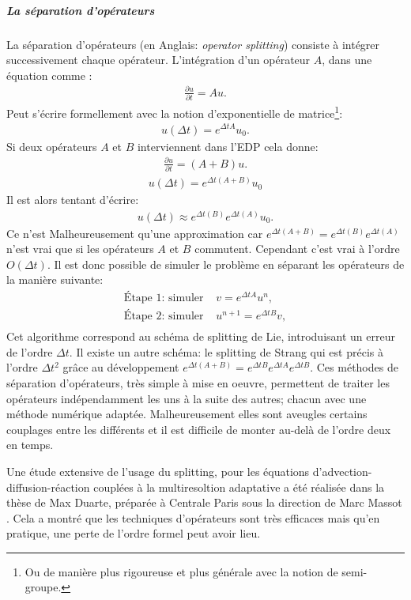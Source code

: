         \subparagraph{La séparation d'opérateurs}
            La séparation d'opérateurs (en Anglais: \textit{operator splitting}) consiste à intégrer successivement chaque opérateur.
            L'intégration d'un opérateur $A$, dans une équation comme :
            \begin{align}\frac{\partial u}{\partial t} = Au.\end{align}
            Peut s'écrire formellement avec la notion d'exponentielle de matrice\footnote{Ou de manière plus rigoureuse et plus générale avec la notion de semi-groupe.}:
            \begin{align}u(\Delta t) = e^{\Delta tA}u_0.\end{align}
            Si deux opérateurs $A$ et $B$ interviennent dans l'EDP cela donne:
            \begin{align}\frac{\partial u}{\partial t} = (A+B)u.\end{align}
            \begin{align}u(\Delta t) = e^{\Delta t (A+B)}u_0 \end{align}
            Il est alors tentant d'écrire:
            \begin{align}u(\Delta t)\approx e^{\Delta t(B)}e^{\Delta t(A)}u_0.\end{align}
            Ce n'est Malheureusement qu'une approximation car $e^{\Delta t(A+B)} = e^{\Delta t(B)}e^{\Delta t(A)}$ n'est vrai que si les opérateurs $A$ et $B$ commutent.
            Cependant c'est vrai à l'ordre $O(\Delta t)$. 
            Il est donc possible de simuler le problème en séparant les opérateurs de la manière suivante: 
            \begin{align}
                \text{Étape 1: simuler }&v=e^{\Delta t A}u^n,\\
                \text{Étape 2: simuler }&u^{n+1}=e^{\Delta t B}v,\\
            \end{align}
            Cet algorithme correspond au schéma de splitting de Lie, introduisant un erreur de l'ordre $\Delta t$. 
            Il existe un autre schéma: le splitting de Strang qui est précis à l'ordre $\Delta t^2$ grâce au développement $e^{\Delta t (A+B)} = e^{\Delta t B}e^{\Delta t A} e^{\Delta t B}$.
            Ces méthodes de séparation d'opérateurs, très simple à mise en oeuvre, permettent de traiter les opérateurs indépendamment les uns à la suite des autres; chacun avec une méthode numérique adaptée.
            Malheureusement elles sont aveugles certains couplages entre les différents et il est difficile de monter au-delà de l'ordre deux en temps.\par
            Une étude extensive de l'usage du splitting, pour les équations d'advection-diffusion-réaction couplées à la multiresoltion adaptative 
            a été réalisée dans la thèse de Max Duarte, préparée à Centrale Paris sous la direction de Marc Massot \cite{duart2011}.
            Cela a montré que les techniques d'opérateurs sont très efficaces mais qu'en pratique, une perte de l'ordre formel peut avoir lieu.

